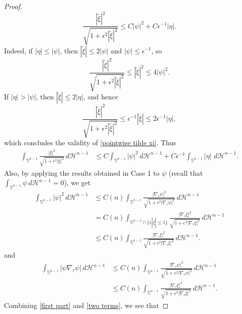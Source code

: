 \documentclass[reqno,11pt]{amsart}
\def\ez{\epsilon}
\numberwithin{equation}{section}
\theoremstyle{remark}
\begin{document}
\begin{proof}
\begin{equation}
\frac{|\tilde\xi|^2}{\sqrt{1+\epsilon^2|\tilde\xi|^2}}
\le
C |\psi|^2 + C\epsilon^{-1}|\eta|.
\end{equation}
Indeed, if $|\eta|\le |\psi|$, then $|\tilde\xi|\le 2|\psi|$ and $|\psi|\le \epsilon^{-1}$, so
$$
\frac{|\tilde\xi|^2}{\sqrt{1+\epsilon^2|\tilde\xi|^2}}
\le |\tilde\xi|^2 \le 4|\psi|^2.
$$
If $|\eta|>|\psi|$, then $|\tilde\xi|\le 2|\eta|$, and hence
$$
\frac{|\tilde\xi|^2}{\sqrt{1+\epsilon^2|\tilde\xi|^2}}
\le \epsilon^{-1}|\tilde\xi|\le 2\epsilon^{-1}|\eta|,
$$
which concludes the validity of \eqref{pointwise tilde xi}. 
Thus
\begin{equation}\label{two terms}
    \begin{split}
     \int_{\mathbb S^{n-1}} \frac{|\xi|^2}{\sqrt{1+\ez^2|\xi|^2}} \,d\mathscr H^{n-1}
 & \leq  C \int_{\mathbb S^{n-1}}  {|\psi|^2}  \,d\mathscr H^{n-1}+ C \ez^{-1}\int_{\mathbb S^{n-1}} |\eta|  \, \,d\mathscr H^{n-1}.
    \end{split}
\end{equation}
Also, by applying the results obtained in Case 1 to $\psi$ (recall that $\int_{\mathbb S^{n-1}}\psi\,d\mathscr H^{n-1}=0$), we get
\begin{equation}
    \begin{split}
   \int_{\mathbb S^{n-1}} |\psi|^2 \,d\mathscr H^{n-1}
  &\le  C(n)  \int_{\mathbb S^{n-1}} \frac{|\nabla_\tau  \psi|^2}{\sqrt{1+\ez^2|\nabla_\tau \psi|^2}} \,d\mathscr H^{n-1}\\
 &=  C(n)  \int_{\mathbb S^{n-1}\cap \{\ez|\tilde\xi|\le 1\}} \frac{|\nabla_\tau  \xi|^2}{\sqrt{1+\ez^2|\nabla_\tau \xi|^2}} \,d\mathscr H^{n-1}\\
  &\le  C(n)  \int_{\mathbb S^{n-1} } \frac{|\nabla_\tau  \xi|^2}{\sqrt{1+\ez^2|\nabla_\tau \xi|^2}} \,d\mathscr H^{n-1}.  \label{first part}
    \end{split}
\end{equation}
and
\begin{equation}
    \begin{split}
\int_{\mathbb S^{n-1}} |\psi \nabla_\tau \psi| \,d\mathscr H^{n-1}& \le  C(n)  \int_{\mathbb S^{n-1}} \frac{|\nabla_\tau  \psi|^2}{\sqrt{1+\ez^2|\nabla_\tau \psi|^2}} \,d\mathscr H^{n-1}  \\
& \le  C(n)  \int_{\mathbb S^{n-1} } \frac{|\nabla_\tau  \xi|^2}{\sqrt{1+\ez^2|\nabla_\tau \xi|^2}} \,d\mathscr H^{n-1}. \label{psi W11}
    \end{split}
\end{equation}
Combining \eqref{first part} and \eqref{two terms}, we see that

\end{proof}
\end{document}
